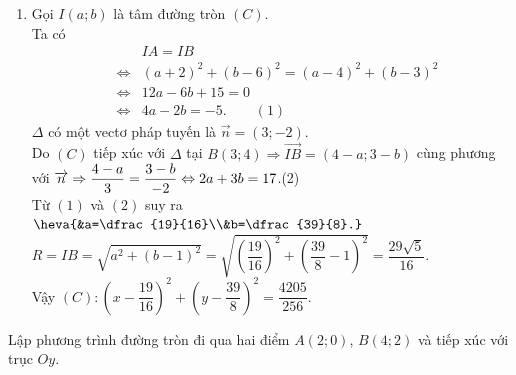 \begin{bt}
{\begin{enumerate}
			Với $ b=1\Rightarrow a=2 \Rightarrow R=2$ suy ra $ (C)\colon (x-2)^2+(y-1)^2=4 $.
			\item Gọi $ I(a;b) $ là tâm đường tròn $ (C) $. \\
			Ta có 
			\allowdisplaybreaks
			\begin{eqnarray*}
				&& IA=IB\\
				&\Leftrightarrow& (a+2)^2+(b-6)^2 =(a-4)^2+(b-3)^2\\
				&\Leftrightarrow&12a-6b+15=0\\
				&\Leftrightarrow&4a-2b=-5.\qquad(1)
			\end{eqnarray*}
			$ \Delta $ có một vectơ pháp tuyến là $ \overrightarrow{n}=(3;-2) $.\\
			Do $ (C) $ tiếp xúc với $ \Delta $ tại $ B(3;4)
			\Rightarrow  \overrightarrow{IB}=(4-a;3-b)$ cùng phương với $ \overrightarrow{n}\\
			\Rightarrow \dfrac{4-a}{3}=\dfrac{3-b}{-2}\Leftrightarrow 2a+3b=17$.\qquad(2)\\
			Từ $ (1) $ và $ (2) $ suy ra $ \heva{&a=\dfrac{19}{16}\\&b=\dfrac{39}{8}.} $\\
			$ R=IB=\sqrt{a^2+(b-1)^2} =\sqrt{\left(\dfrac{19}{16}\right)^2+\left(\dfrac{39}{8}-1\right)^2}=\dfrac{29\sqrt{5}}{16}$.\\
			Vậy $ (C)\colon \left(x-\dfrac{19}{16}\right)^2+ \left(y-\dfrac{39}{8}\right)^2=\dfrac{4205}{256}$.
		\end{enumerate}
		
	}
\end{bt}
\begin{bt}%
	Lập phương trình đường tròn  đi qua hai điểm $A(2;0) $, $ B(4;2) $ và tiếp xúc với trục  $Oy $. 
\end{bt}
